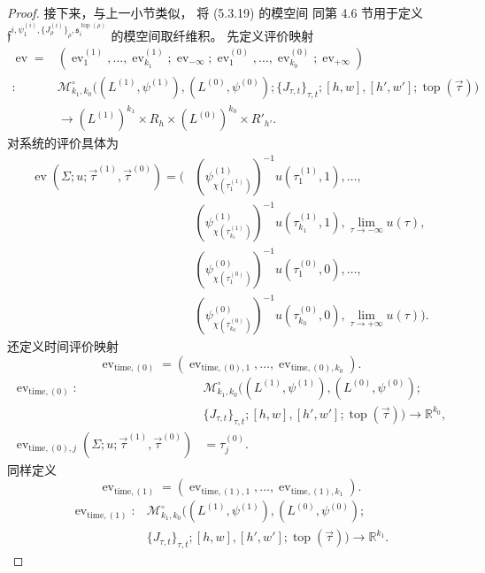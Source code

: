 \begin{proof}
接下来，与上一小节类似，
将 (5.3.19) 的模空间
同第 4.6 节用于定义
$\mathfrak f^{i,\psi^{(i)}_1,
\{J^{(i)}_\rho\}_\rho,
\mathfrak s_i^{\operatorname{top}(\rho)}}$
的模空间取纤维积。
先定义评价映射
\[
\begin{aligned}
\operatorname{ev}
={}&(\operatorname{ev}^{(1)}_1,\ldots,
\operatorname{ev}^{(1)}_{k_1};
\operatorname{ev}_{-\infty};
\operatorname{ev}^{(0)}_1,\ldots,
\operatorname{ev}^{(0)}_{k_0};
\operatorname{ev}_{+\infty})
\\
\colon&
\mathcal M^\circ_{k_1,k_0}
\bigl(
(L^{(1)},\psi^{(1)}),
(L^{(0)},\psi^{(0)});
\{J_{\tau,t}\}_{\tau,t};
[h,w],[h',w'];\operatorname{top}(\vec\tau)
\bigr)
\\
&\longrightarrow
(L^{(1)})^{k_1}\times R_h
\times(L^{(0)})^{k_0}\times R'_{h'}.
\end{aligned}
\]
对系统的评价具体为
\[
\begin{aligned}
\operatorname{ev}
(\Sigma;u;\vec\tau^{(1)},\vec\tau^{(0)})
=\bigl(
 &(\psi^{(1)}_{\chi(\tau_1^{(1)})})^{-1}
 u(\tau_1^{(1)},1),\ldots,
\\
 &(\psi^{(1)}_{\chi(\tau_{k_1}^{(1)})})^{-1}
 u(\tau_{k_1}^{(1)},1),
 \lim_{\tau\to-\infty}u(\tau),
\\
 &(\psi^{(0)}_{\chi(\tau_1^{(0)})})^{-1}
 u(\tau_1^{(0)},0),\ldots,
\\
 &(\psi^{(0)}_{\chi(\tau_{k_0}^{(0)})})^{-1}
 u(\tau_{k_0}^{(0)},0),
 \lim_{\tau\to+\infty}u(\tau)
 \bigr).
\end{aligned}
\]
还定义时间评价映射
\[
\operatorname{ev}_{\mathrm{time},(0)}
=(\operatorname{ev}_{\mathrm{time},(0),1},
\ldots,\operatorname{ev}_{\mathrm{time},(0),k_0}).
\]
\[
\begin{aligned}
\operatorname{ev}_{\mathrm{time},(0)}\colon&
\mathcal M^\circ_{k_1,k_0}
\bigl((L^{(1)},\psi^{(1)}),
(L^{(0)},\psi^{(0)});
\\[-1mm]
&\{J_{\tau,t}\}_{\tau,t};
[h,w],[h',w'];\operatorname{top}(\vec\tau)\bigr)
\longrightarrow\mathbb R^{k_0},
\\
\operatorname{ev}_{\mathrm{time},(0),j}
(\Sigma;u;\vec\tau^{(1)},\vec\tau^{(0)})
&=\tau_j^{(0)}.
\end{aligned}
\]
同样定义
\[
\operatorname{ev}_{\mathrm{time},(1)}
=(\operatorname{ev}_{\mathrm{time},(1),1},
\ldots,\operatorname{ev}_{\mathrm{time},(1),k_1}).
\]
\[
\begin{aligned}
\operatorname{ev}_{\mathrm{time},(1)}\colon&
\mathcal M^\circ_{k_1,k_0}
\bigl((L^{(1)},\psi^{(1)}),
(L^{(0)},\psi^{(0)});
\\[-1mm]
&\{J_{\tau,t}\}_{\tau,t};
[h,w],[h',w'];\operatorname{top}(\vec\tau)\bigr)
\longrightarrow\mathbb R^{k_1}.
\end{aligned}
\]


\end{proof}
